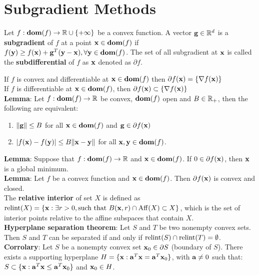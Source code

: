 \section{Subgradient Methods}
\begin{framed}
    Let $f : \textbf{dom}(f) \rightarrow \mathbb{R} \cup \{+\infty\}$ be a convex function. A vector $\mathbf{g} \in \mathbb{R}^d$ is a \textbf{subgradient} of $f$ at a point $\mathbf{x} \in \textbf{dom}(f)$ if $f(\mathbf{y}) \geq f(\mathbf{x}) + \mathbf{g}^T (\mathbf{y} - \mathbf{x}), \forall \mathbf{y} \in \textbf{dom}(f)$. The set of all subgradient at $\mathbf{x}$ is called the \textbf{subdifferential} of $f$ as $\mathbf{x}$ denoted as $\partial f$.
\end{framed}
If $f$ is convex and differentiable at $\mathbf{x} \in \textbf{dom}(f)$ then $\partial f(\mathbf{x}) = \{ \nabla f(\mathbf{x})\}$ \\
If $f$ is differentiable at $\mathbf{x} \in \textbf{dom}(f)$, then $\partial f(\mathbf{x}) \subset \{ \nabla f(\mathbf{x})\}$ \\
\textbf{Lemma}: Let $f: \textbf{dom}(f) \rightarrow \mathbb{R}$ be convex, $\textbf{dom}(f)$ open and $B \in \mathbb{R}_{+}$, then the following are equivalent:
\begin{enumerate}[label=(\roman*)]    
    \itemsep0em
    \item $\norm{\mathbf{g}} \leq B$ for all $\mathbf{x} \in \textbf{dom}(f)$ and $\mathbf{g} \in \partial f(\mathbf{x})$ \\
    \item  $\abs{f(\mathbf{x}) - f(\mathbf{y})} \leq B \norm{\mathbf{x} - \mathbf{y}}$ for all $\mathbf{x}, \mathbf{y} \in \textbf{dom}(f)$.
\end{enumerate}
\textbf{Lemma}: Suppose that $f : \textbf{dom}(f) \rightarrow \mathbb{R}$ and $\mathbf{x} \in \textbf{dom}(f)$. If $0 \in \partial f(\mathbf{x})$, then $\mathbf{x}$ is a global minimum. \\
\textbf{Lemma}: Let $f$ be a convex function and $\mathbf{x} \in \textbf{dom}(f)$. Then $\partial f(\mathbf{x})$ is convex and closed. \\
The \textbf{relative interior} of set $X$ is defined as $\mathrm{relint}(X) = \{\mathbf{x} : \exists r > 0, \text{such that } B(\mathbf{x}, r) \cap \mathrm{Aff}(X) \subset X\}$, which is the set of interior points relative to the affine subspaces that contain $X$. \\
\textbf{Hyperplane separation theorem}: Let $S$ and $T$ be two nonempty convex sets. Then $S$ and $T$ can be separated if and only if $\mathrm{relint}(S) \cap \mathrm{relint}(T) = \emptyset$. \\
\textbf{Corrolary}: Let $S$ be a nonempty convex set $\mathbf{x}_0 \in \partial S$ (boundary of $S$). There exists a supporting hyperplane $H = \{\mathbf{x} : \mathbf{a}^T \mathbf{x} = \mathbf{a}^T \mathbf{x}_0\}$, with $\mathbf{a} \neq 0$ such that: $S \subset \{ \mathbf{x} : \mathbf{a}^T \mathbf{x} \leq \mathbf{a}^T \mathbf{x}_0\}$ and $\mathbf{x}_0  \in H$. \\
